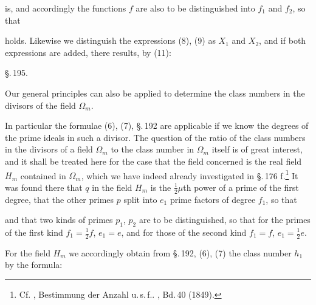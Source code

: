 is, and accordingly the functions $f$ are also to be distinguished
into $f_1$ and $f_2$, so that

holds. Likewise we distinguish the expressions (8), (9) as $X_1$
and $X_2$, and if both expressions are added, there results, by
(11):

\begin{center}
\S.\,195.\\[4pt]
\end{center}

Our general principles can also be applied to determine the class
numbers in the divisors of the field $\Omega_m$.

In particular the formulae (6), (7), \S.\,192 are applicable if we
know the degrees of the prime ideals in such a divisor. The question
of the ratio of the class numbers in the divisors of a field
$\Omega_m$ to the class number in $\Omega_m$ itself is of great
interest, and it shall be treated here for the case that the field
concerned is the real field $H_m$ contained in $\Omega_m$, which we
have indeed already investigated in \S.\,176 f.\footnote{Cf.
, \glqq Bestimmung der Anzahl u.\,s.\,f.\grqq{}.
, Bd.\,40 (1849).} It was found there that
$q$ in the field $H_m$ is the $\tfrac12\mu$th power of a prime of
the first degree, that the other primes $p$ split into $e_1$ prime
factors of degree $f_1$, so that

and that two kinds of primes $p_1$, $p_2$ are to be distinguished,
so that for the primes of the first kind $f_1 = \tfrac12 f$,
$e_1 = e$, and for those of the second kind $f_1 = f$,
$e_1 = \tfrac12 e$.

For the field $H_m$ we accordingly obtain from \S.\,192, (6), (7)
the class number $h_1$ by the formula:
